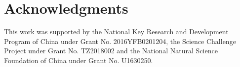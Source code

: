 \documentclass[prb,reprint]{revtex4-2}
\begin{document}
% 
%
\section*{Acknowledgments}
\label{sec:acknowledgments}

This work was supported by the National Key Research and Development Program of 
China under Grant No. 2016YFB0201204, the Science Challenge Project under Grant 
No. TZ2018002 and the National Natural Science Foundation of China under Grant 
No. U1630250.

% 
%

\end{document}
